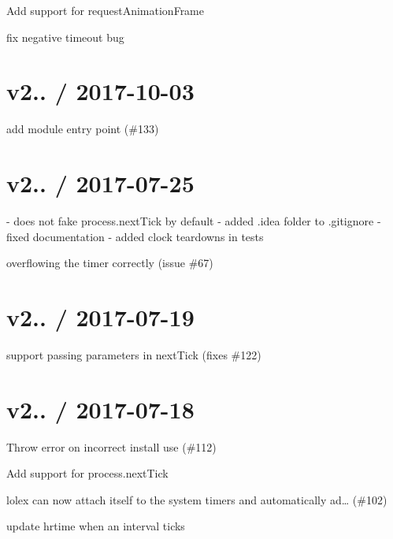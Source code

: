 \begin{DoxyItemize}
\item Add support for request\+Animation\+Frame
\item fix negative timeout bug
\end{DoxyItemize}

\section*{v2.. / 2017-\/10-\/03 }


\begin{DoxyItemize}
\item add module entry point (\#133)
\end{DoxyItemize}

\section*{v2.. / 2017-\/07-\/25 }


\begin{DoxyItemize}
\item -\/ does not fake process.\+next\+Tick by default -\/ added .idea folder to .gitignore -\/ fixed documentation -\/ added clock teardowns in tests
\item overflowing the timer correctly (issue \#67)
\end{DoxyItemize}

\section*{v2.. / 2017-\/07-\/19 }


\begin{DoxyItemize}
\item support passing parameters in next\+Tick (fixes \#122)
\end{DoxyItemize}

\section*{v2.. / 2017-\/07-\/18 }


\begin{DoxyItemize}
\item Throw error on incorrect install use (\#112)
\item Add support for process.\+next\+Tick
\item lolex can now attach itself to the system timers and automatically ad… (\#102)
\item update hrtime when an interval ticks
\end{DoxyItemize}

